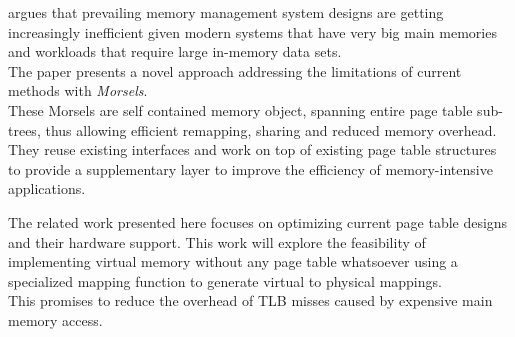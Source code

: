 
\cite{zagieboylo2020cost}


\cite{halbuer2023morsels} argues that prevailing memory management system designs are getting increasingly inefficient given modern systems that have very big main memories and workloads that require large in-memory data sets.\\
The paper presents a novel approach addressing the limitations of current methods with \emph{Morsels}.\\
These Morsels are self contained memory object, spanning entire page table sub-trees, thus allowing efficient remapping, sharing and reduced memory overhead.\\
They reuse existing interfaces and work on top of existing page table structures to provide a supplementary layer to improve the efficiency of memory-intensive applications.


The related work presented here focuses on optimizing current page table designs and their hardware
support. This work will explore the feasibility of implementing virtual memory without any page table whatsoever using a specialized mapping function to generate virtual to physical mappings.\\
This promises to reduce the overhead of TLB misses caused by expensive main memory access.

